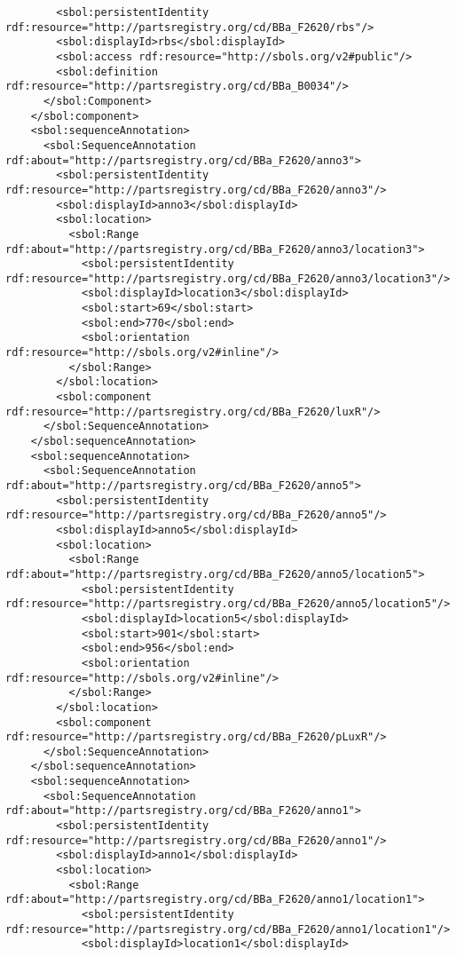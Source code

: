\begin{lstlisting}
        <sbol:persistentIdentity rdf:resource="http://partsregistry.org/cd/BBa_F2620/rbs"/>
        <sbol:displayId>rbs</sbol:displayId>
        <sbol:access rdf:resource="http://sbols.org/v2#public"/>
        <sbol:definition rdf:resource="http://partsregistry.org/cd/BBa_B0034"/>
      </sbol:Component>
    </sbol:component>
    <sbol:sequenceAnnotation>
      <sbol:SequenceAnnotation rdf:about="http://partsregistry.org/cd/BBa_F2620/anno3">
        <sbol:persistentIdentity rdf:resource="http://partsregistry.org/cd/BBa_F2620/anno3"/>
        <sbol:displayId>anno3</sbol:displayId>
        <sbol:location>
          <sbol:Range rdf:about="http://partsregistry.org/cd/BBa_F2620/anno3/location3">
            <sbol:persistentIdentity rdf:resource="http://partsregistry.org/cd/BBa_F2620/anno3/location3"/>
            <sbol:displayId>location3</sbol:displayId>
            <sbol:start>69</sbol:start>
            <sbol:end>770</sbol:end>
            <sbol:orientation rdf:resource="http://sbols.org/v2#inline"/>
          </sbol:Range>
        </sbol:location>
        <sbol:component rdf:resource="http://partsregistry.org/cd/BBa_F2620/luxR"/>
      </sbol:SequenceAnnotation>
    </sbol:sequenceAnnotation>
    <sbol:sequenceAnnotation>
      <sbol:SequenceAnnotation rdf:about="http://partsregistry.org/cd/BBa_F2620/anno5">
        <sbol:persistentIdentity rdf:resource="http://partsregistry.org/cd/BBa_F2620/anno5"/>
        <sbol:displayId>anno5</sbol:displayId>
        <sbol:location>
          <sbol:Range rdf:about="http://partsregistry.org/cd/BBa_F2620/anno5/location5">
            <sbol:persistentIdentity rdf:resource="http://partsregistry.org/cd/BBa_F2620/anno5/location5"/>
            <sbol:displayId>location5</sbol:displayId>
            <sbol:start>901</sbol:start>
            <sbol:end>956</sbol:end>
            <sbol:orientation rdf:resource="http://sbols.org/v2#inline"/>
          </sbol:Range>
        </sbol:location>
        <sbol:component rdf:resource="http://partsregistry.org/cd/BBa_F2620/pLuxR"/>
      </sbol:SequenceAnnotation>
    </sbol:sequenceAnnotation>
    <sbol:sequenceAnnotation>
      <sbol:SequenceAnnotation rdf:about="http://partsregistry.org/cd/BBa_F2620/anno1">
        <sbol:persistentIdentity rdf:resource="http://partsregistry.org/cd/BBa_F2620/anno1"/>
        <sbol:displayId>anno1</sbol:displayId>
        <sbol:location>
          <sbol:Range rdf:about="http://partsregistry.org/cd/BBa_F2620/anno1/location1">
            <sbol:persistentIdentity rdf:resource="http://partsregistry.org/cd/BBa_F2620/anno1/location1"/>
            <sbol:displayId>location1</sbol:displayId>

\end{lstlisting}

